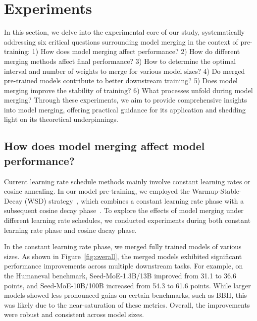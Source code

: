 

\section{Experiments}


In this section, we delve into the experimental core of our study, systematically addressing six critical questions surrounding model merging in the context of pre-training: 1) How does model merging affect  performance? 2) How do different merging methods affect final performance? 3) How to determine the optimal interval and number of weights to merge for various model sizes? 4) Do merged pre-trained models contribute to better downstream training? 5) Does model merging improve the stability of training? 6) What processes unfold during model merging? Through these experiments, we aim to provide comprehensive insights into model merging, offering practical guidance for its application and shedding light on its theoretical underpinnings.

\subsection{How does model merging affect model performance?}
Current learning rate schedule methods mainly involve constant learning rates or cosine annealing. In our model pre-training, we employed the Warmup-Stable-Decay (WSD) strategy~\cite{hu2024minicpm}, which combines a constant learning rate phase with a subsequent cosine decay phase~\cite{loshchilov2016sgdr}. To explore the effects of model merging under different learning rate schedules, we conducted experiments during both constant learning rate phase and cosine dacay phase.

In the constant learning rate phase, we merged fully trained models of various sizes. As shown in Figure~\ref{fig:overall}, the merged models exhibited significant performance improvements across multiple downstream tasks. For example, on the Humaneval benchmark, Seed-MoE-1.3B/13B improved from 31.1 to 36.6 points, and Seed-MoE-10B/100B increased from 54.3 to 61.6 points. While larger models showed less pronounced gains on certain benchmarks, such as BBH, this was likely due to the near-saturation of these metrics. Overall, the improvements were robust and consistent across model sizes.

